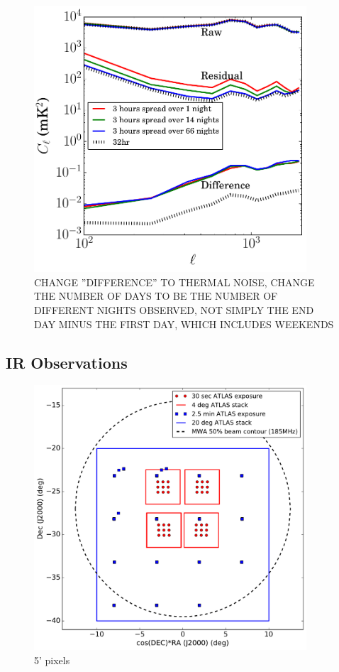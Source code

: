 \documentclass[preprint]{aastex}
\begin{document}
\begin{figure}[h]
\centering
\includegraphics[width=4in]{images/res_pspec_of_100_obsids_with_diff_spacings.pdf}
\caption{CHANGE  ''DIFFERENCE'' TO THERMAL NOISE, CHANGE THE NUMBER OF DAYS TO BE THE NUMBER OF DIFFERENT NIGHTS OBSERVED, NOT SIMPLY THE END DAY MINUS THE FIRST DAY, WHICH INCLUDES WEEKENDS}
\label{fig:respspecspacingsstudy}
\end{figure}

\subsection{IR Observations}

\begin{figure}[h]
\centering
\includegraphics[width=4in]{images/survey_overview.pdf}
\caption{5' pixels}
\label{fig:surveyoverview}
\end{figure}
\end{document}
